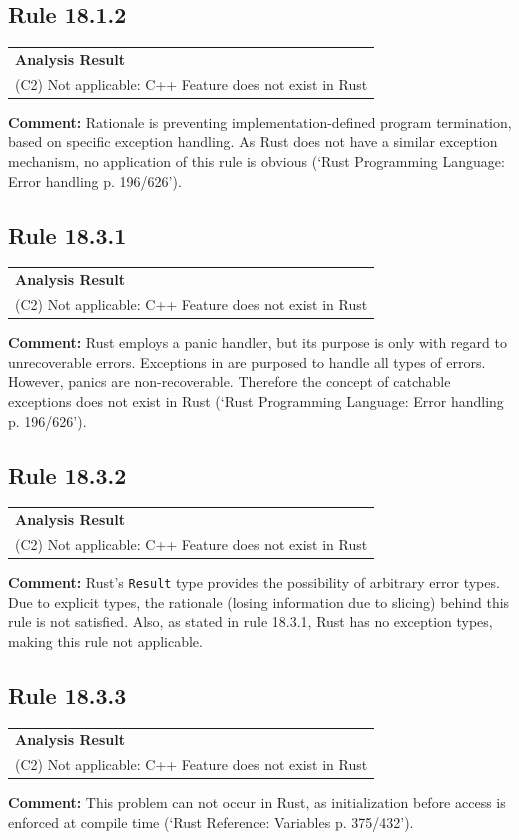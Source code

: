\subsection*{Rule 18.1.2}
\begin{longtable}{p{13cm}}
\textbf{Analysis Result} \\
(C2) Not applicable: C++ Feature does not exist in Rust \\
\end{longtable}
\textbf{Comment:} Rationale is preventing implementation-defined program termination, based on \Cpp specific exception handling. As Rust does not have a similar exception mechanism, no application of this rule is obvious (`Rust Programming Language: Error handling p. 196/626'). \\
\subsection*{Rule 18.3.1}
\begin{longtable}{p{13cm}}
\textbf{Analysis Result} \\
(C2) Not applicable: C++ Feature does not exist in Rust \\
\end{longtable}
\textbf{Comment:} Rust employs a panic handler, but its purpose is only with regard to unrecoverable errors. Exceptions in \Cpp are purposed to handle all types of errors. However, panics are non-recoverable. Therefore the concept of catchable exceptions does not exist in Rust (`Rust Programming Language: Error handling p. 196/626'). \\
\subsection*{Rule 18.3.2}
\begin{longtable}{p{13cm}}
\textbf{Analysis Result} \\
(C2) Not applicable: C++ Feature does not exist in Rust \\
\end{longtable}
\textbf{Comment:} Rust's \texttt{Result} type provides the possibility of arbitrary error types. Due to explicit types, the rationale (losing information due to slicing) behind this rule is not satisfied. Also, as stated in rule 18.3.1, Rust has no exception types, making this rule not applicable. \\
\subsection*{Rule 18.3.3}
\begin{longtable}{p{13cm}}
\textbf{Analysis Result} \\
(C2) Not applicable: C++ Feature does not exist in Rust \\
\end{longtable}
\textbf{Comment:} This problem can not occur in Rust, as initialization before access is enforced at compile time (`Rust Reference: Variables p. 375/432'). \\
